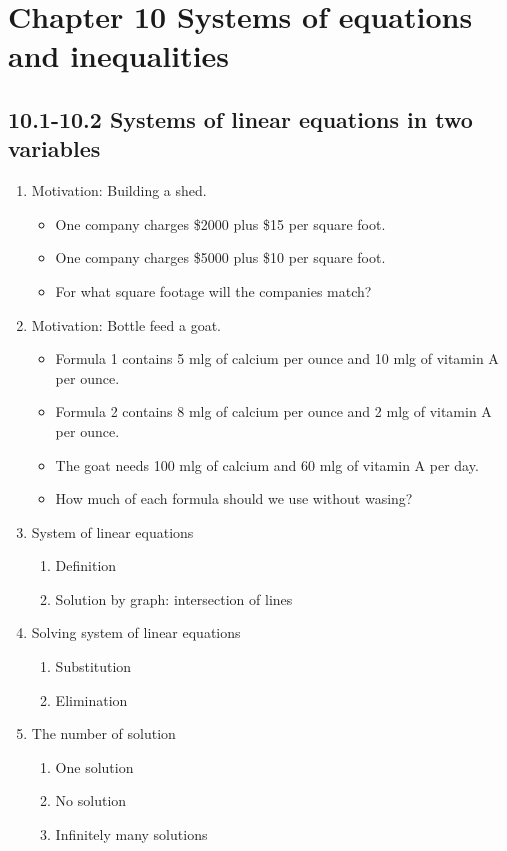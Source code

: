 \documentclass{article}
\begin{document}
\section{Chapter 10 Systems of equations and inequalities}

\subsection{10.1-10.2 Systems of linear equations in two variables}


\begin{enumerate}
\item Motivation: Building a shed. 
\begin{itemize}
\item One company charges \$2000 plus \$15 per square foot. 
\item One company charges \$5000 plus \$10 per square foot. 
\item For what square footage will the companies match?	
\end{itemize}

\item Motivation: Bottle feed a goat.
\begin{itemize}
\item Formula 1 contains 5 mlg of calcium per ounce and 10 mlg of vitamin A per ounce.
\item Formula 2 contains 8 mlg of calcium per ounce and 2 mlg of vitamin A per ounce.
\item The goat needs 100 mlg of calcium and 60 mlg of vitamin A per day.
\item How much of each formula should we use without wasing?
\end{itemize}

\item System of linear equations
\begin{enumerate}
\item Definition
\item Solution by graph: intersection of lines
\end{enumerate}
\item Solving system of linear equations
\begin{enumerate}
\item Substitution
\item Elimination
\end{enumerate}
\item The number of solution
\begin{enumerate}
\item One solution
\item No solution
\item Infinitely many solutions
\end{enumerate}
\end{enumerate}
\end{document}
